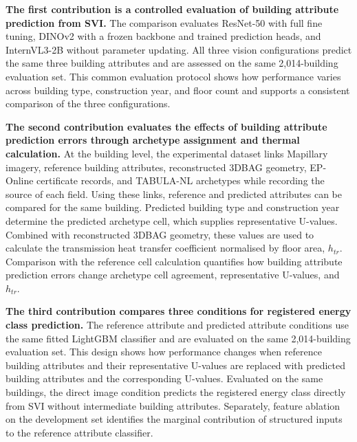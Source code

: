 \textbf{The first contribution is a controlled evaluation of building attribute prediction from SVI.}
The comparison evaluates ResNet-50 with full fine tuning, DINOv2 with a frozen backbone and trained prediction heads, and InternVL3-2B without parameter updating. All three vision configurations predict the same three building attributes and are assessed on the same 2,014-building evaluation set. This common evaluation protocol shows how performance varies across building type, construction year, and floor count and supports a consistent comparison of the three configurations.

\textbf{The second contribution evaluates the effects of building attribute prediction errors through archetype assignment and thermal calculation.}
At the building level, the experimental dataset links Mapillary imagery, reference building attributes, reconstructed 3DBAG geometry, EP-Online certificate records, and TABULA-NL archetypes while recording the source of each field. Using these links, reference and predicted attributes can be compared for the same building. Predicted building type and construction year determine the predicted archetype cell, which supplies representative U-values. Combined with reconstructed 3DBAG geometry, these values are used to calculate the transmission heat transfer coefficient normalised by floor area, $h_{tr}$. Comparison with the reference cell calculation quantifies how building attribute prediction errors change archetype cell agreement, representative U-values, and $h_{tr}$.

\textbf{The third contribution compares three conditions for registered energy class prediction.}
The reference attribute and predicted attribute conditions use the same fitted LightGBM classifier and are evaluated on the same 2,014-building evaluation set. This design shows how performance changes when reference building attributes and their representative U-values are replaced with predicted building attributes and the corresponding U-values. Evaluated on the same buildings, the direct image condition predicts the registered energy class directly from SVI without intermediate building attributes. Separately, feature ablation on the development set identifies the marginal contribution of structured inputs to the reference attribute classifier. 
